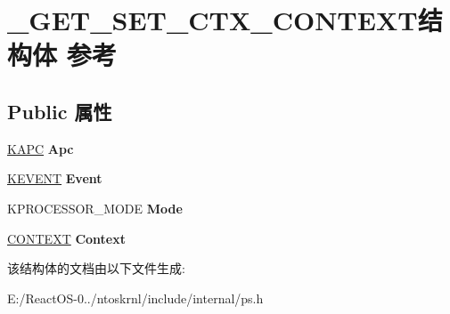 \hypertarget{struct___g_e_t___s_e_t___c_t_x___c_o_n_t_e_x_t}{}\section{\+\_\+\+G\+E\+T\+\_\+\+S\+E\+T\+\_\+\+C\+T\+X\+\_\+\+C\+O\+N\+T\+E\+X\+T结构体 参考}
\label{struct___g_e_t___s_e_t___c_t_x___c_o_n_t_e_x_t}
\subsection*{Public 属性}
\begin{DoxyCompactItemize}
\item 
\mbox{\label{struct___g_e_t___s_e_t___c_t_x___c_o_n_t_e_x_t_a7adfeabdd17018fb65f6c73298b0677f}} 
\hyperlink{struct___k_a_p_c}{K\+A\+PC} {\bfseries Apc}
\item 
\mbox{\label{struct___g_e_t___s_e_t___c_t_x___c_o_n_t_e_x_t_a984d083cfc3bb6b001d9285b5ad185f7}} 
\hyperlink{struct___k_e_v_e_n_t}{K\+E\+V\+E\+NT} {\bfseries Event}
\item 
\mbox{\label{struct___g_e_t___s_e_t___c_t_x___c_o_n_t_e_x_t_aade0fcd43af428b7138152cd7cad6ba9}} 
K\+P\+R\+O\+C\+E\+S\+S\+O\+R\+\_\+\+M\+O\+DE {\bfseries Mode}
\item 
\mbox{\label{struct___g_e_t___s_e_t___c_t_x___c_o_n_t_e_x_t_a7be5335c588459dcf1aac4ec85dd995d}} 
\hyperlink{struct___c_o_n_t_e_x_t}{C\+O\+N\+T\+E\+XT} {\bfseries Context}
\end{DoxyCompactItemize}


该结构体的文档由以下文件生成\+:\begin{DoxyCompactItemize}
\item 
E\+:/\+React\+O\+S-\/0../ntoskrnl/include/internal/ps.\+h\end{DoxyCompactItemize}
